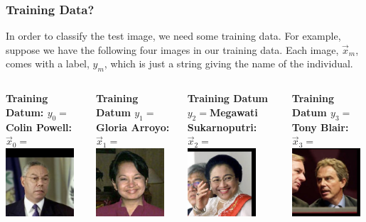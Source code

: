 \documentclass{beamer}
\begin{document}
\begin{frame}
  \frametitle{Training Data?}
  In order to classify the test image, we need some training data.
  For example, suppose we have the following four images in our
  training data.  Each image, $\vec{x}_m$, comes with a label, $y_m$,
  which is just a string giving the name of the individual.
  \begin{columns}
    \column{1.05in}
    \begin{block}{\bf Training Datum: $y_0=$Colin Powell:}
      $\vec{x}_0=$
      \includegraphics[width=1in]{Colin_Powell_0001.jpg}
    \end{block}
    \column{1.05in}
    \begin{block}{\bf Training Datum $y_1=$Gloria Arroyo:}
      $\vec{x}_1=$
      \includegraphics[width=1in]{Gloria_Macapagal_Arroyo_0001.jpg}
    \end{block}
    \column{1.05in}
    \begin{block}{\bf Training Datum $y_2=$Megawati Sukarnoputri:}
      $\vec{x}_2=$
      \includegraphics[width=1in]{Megawati_Sukarnoputri_0001.jpg}
    \end{block}
    \column{1.05in}
    \begin{block}{\bf Training Datum $y_3=$Tony Blair:}
      $\vec{x}_3=$
      \includegraphics[width=1in]{Tony_Blair_0001.jpg}
    \end{block}
  \end{columns}
\end{frame}
    
\end{document}
